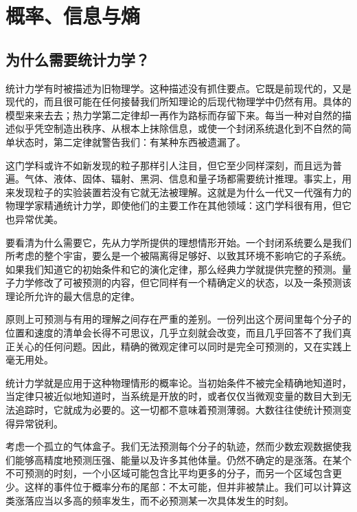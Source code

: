 \chapter{概率、信息与熵}


\section{为什么需要统计力学？}

统计力学有时被描述为旧物理学。这种描述没有抓住要点。它既是前现代的，又是现代的，而且很可能在任何接替我们所知理论的后现代物理学中仍然有用。具体的模型来来去去；热力学第二定律却一再作为路标而存留下来。每当一种对自然的描述似乎凭空制造出秩序、从根本上抹除信息，或使一个封闭系统退化到不自然的简单状态时，第二定律就警告我们：有某种东西被遗漏了。

这门学科或许不如新发现的粒子那样引人注目，但它至少同样深刻，而且远为普遍。气体、液体、固体、辐射、黑洞、信息和量子场都需要统计推理。事实上，用来发现粒子的实验装置若没有它就无法被理解。这就是为什么一代又一代强有力的物理学家精通统计力学，即使他们的主要工作在其他领域：这门学科很有用，但它也异常优美。

要看清为什么需要它，先从力学所提供的理想情形开始。一个封闭系统要么是我们所考虑的整个宇宙，要么是一个被隔离得足够好、以致其环境不影响它的子系统。如果我们知道它的初始条件和它的演化定律，那么经典力学就提供完整的预测。量子力学修改了可被预测的内容，但它同样有一个精确定义的状态，以及一条预测该理论所允许的最大信息的定律。

原则上可预测与有用的理解之间存在严重的差别。一份列出这个房间里每个分子的位置和速度的清单会长得不可思议，几乎立刻就会改变，而且几乎回答不了我们真正关心的任何问题。因此，精确的微观定律可以同时是完全可预测的，又在实践上毫无用处。

统计力学就是应用于这种物理情形的概率论。当初始条件不被完全精确地知道时，当定律只被近似地知道时，当系统是开放的时，或者仅仅当微观变量的数目大到无法追踪时，它就成为必要的。这一切都不意味着预测薄弱。大数往往使统计预测变得异常锐利。

考虑一个孤立的气体盒子。我们无法预测每个分子的轨迹，然而少数宏观数据使我们能够高精度地预测压强、能量以及许多其他体量。仍然不确定的是涨落。在某个不可预测的时刻，一个小区域可能包含比平均更多的分子，而另一个区域包含更少。这样的事件位于概率分布的尾部：不太可能，但并非被禁止。我们可以计算这类涨落应当以多高的频率发生，而不必预测某一次具体发生的时刻。

